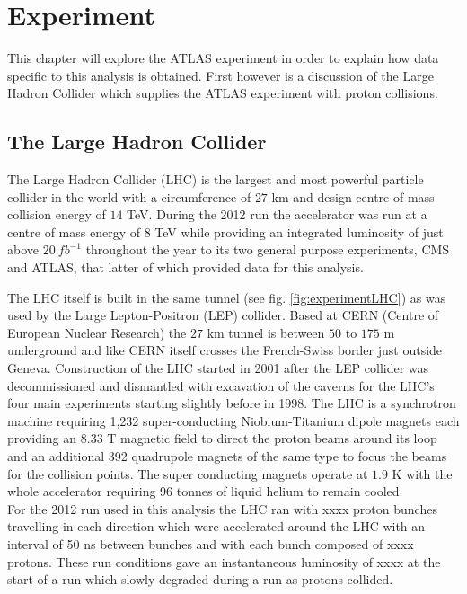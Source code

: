 \chapter{Experiment}

	This chapter will explore the ATLAS experiment in order to explain how data specific to this analysis is obtained. First however is a discussion of the Large Hadron Collider which supplies the ATLAS experiment with proton collisions.

\section{The Large Hadron Collider}

	The Large Hadron Collider (LHC) \cite{Brüning:782076} is the largest and most powerful particle collider in the world with a circumference of $27$ km and design centre of mass collision energy of $14$ TeV. During the 2012 run the accelerator was run at a centre of mass energy of $8$ TeV while providing an integrated luminosity of just above $20~fb^{-1}$ throughout the year to its two general purpose experiments, CMS and ATLAS, that latter of which provided data for this analysis.
	
	The LHC itself is built in the same tunnel (see fig. \ref{fig:experimentLHC}) as was used by the Large Lepton-Positron (LEP) collider. Based at CERN (Centre of European Nuclear Research) the $27$ km tunnel is between $50$ to $175$ m underground and like CERN itself crosses the French-Swiss border just outside Geneva. Construction of the LHC started in 2001 after the LEP collider was decommissioned and dismantled with excavation of the caverns for the LHC's four main experiments starting slightly before in 1998. 
	The LHC is a synchrotron machine requiring 1,232 super-conducting Niobium-Titanium dipole magnets each providing an $8.33$ T magnetic field to direct the proton beams around its loop and an additional 392 quadrupole magnets of the same type to focus the beams for the collision points. The super conducting magnets operate at $1.9$ K with the whole accelerator requiring 96 tonnes of liquid helium to remain cooled.\\

	For the 2012 run used in this analysis the LHC ran with xxxx proton bunches travelling in each direction which were accelerated around the LHC with an interval of 50 ns between bunches and with each bunch composed of xxxx protons. These run conditions gave an instantaneous luminosity of xxxx at the start of a run which slowly degraded during a run as protons collided. %

